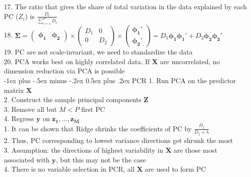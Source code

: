 \documentclass[10pt,landscape]{article}
\makeatletter
\renewcommand{\section}{\@startsection{section}{1}{0mm}%
                                {-1ex plus -.5ex minus -.2ex}%
                                {0.5ex plus .2ex}%
                                {\normalfont\large\bfseries}}
\makeatother
\begin{document}
\begin{multicols}{4}
17. The ratio that gives the share of total variation in the data explained by each PC ($Z_i$) is $\frac{D_i}{\sum_{i=1}^P D_i}$\\
18. $\boldsymbol{\Sigma} = 
\begin{pmatrix}
    \boldsymbol{\phi_1} & \boldsymbol{\phi_2}
\end{pmatrix}
\times 
\begin{pmatrix}
    D_1 & 0 \\
    0 & D_2
\end{pmatrix}
\times 
\begin{pmatrix}
    \boldsymbol{\phi_1'}\\
    \boldsymbol{\phi_2'}
\end{pmatrix}
=D_1 \boldsymbol{\phi_1 \phi_1'} + D_2 \boldsymbol{\phi_2 \phi_2'}$\\
19. PC are not scale-invariant, we need to standardize the data\\
20. PCA works best on highly correlated data. If $\boldsymbol{X}$ are uncorrelated, no dimension reduction via PCA is possible\\

\section{PCR}
1. Run PCA on the predictor matrix $\boldsymbol{X}$\\
2. Construct the sample principal components $\boldsymbol{Z}$\\
3. Remove all but $M < P$ first PC\\
4. Regress $\boldsymbol{y}$ on $\boldsymbol{z_1, \ldots, z_M}$\\
1. It can be shown that Ridge shrinks the coefficients of PC by $\frac{D_j}{D_j + \lambda}$\\
2. Thus, PC corresponding to lowest variance directions get shrunk the most\\
3. Assumption: the directions of highest variability in $\boldsymbol{X}$ are those most associated with $\boldsymbol{y}$, but this may not be the case\\
4. There is no variable selection in PCR, all $\boldsymbol{X}$ are used to form PC


\end{multicols}
\end{document}
